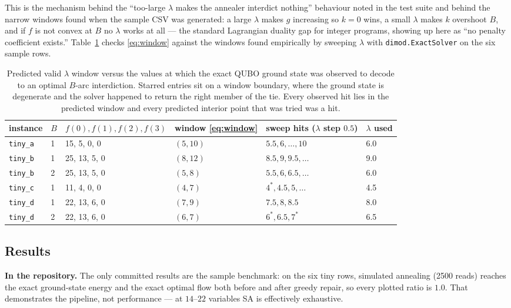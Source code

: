\documentclass[11pt]{article}
\newcommand{\code}[1]{\texttt{#1}}
\begin{document}
This is the mechanism behind the ``too-large $\lambda$ makes the annealer interdict nothing'' behaviour noted in the test suite and behind the narrow windows found when the sample CSV was generated: a large $\lambda$ makes $g$ increasing so $k=0$ wins, a small $\lambda$ makes $k$ overshoot $B$, and if $f$ is not convex at $B$ no $\lambda$ works at all --- the standard Lagrangian duality gap for integer programs, showing up here as ``no penalty coefficient exists.'' Table~\ref{tab:windows} checks \eqref{eq:window} against the windows found empirically by sweeping $\lambda$ with \code{dimod.ExactSolver} on the six sample rows.

\begin{table}[h]
\centering
\small
\begin{tabular}{llllll}
\toprule
instance & $B$ & $f(0),f(1),f(2),f(3)$ & window \eqref{eq:window} & sweep hits ($\lambda$ step $0.5$) & $\lambda$ used \\
\midrule
\code{tiny\_a} & 1 & 15, 5, 0, 0 & $(5, 10)$ & $5.5, 6, \dots, 10$ & 6.0 \\
\code{tiny\_b} & 1 & 25, 13, 5, 0 & $(8, 12)$ & $8.5, 9, 9.5, \dots$ & 9.0 \\
\code{tiny\_b} & 2 & 25, 13, 5, 0 & $(5, 8)$ & $5.5, 6, 6.5, \dots$ & 6.0 \\
\code{tiny\_c} & 1 & 11, 4, 0, 0 & $(4, 7)$ & $4^{*}, 4.5, 5, \dots$ & 4.5 \\
\code{tiny\_d} & 1 & 22, 13, 6, 0 & $(7, 9)$ & $7.5, 8, 8.5$ & 8.0 \\
\code{tiny\_d} & 2 & 22, 13, 6, 0 & $(6, 7)$ & $6^{*}, 6.5, 7^{*}$ & 6.5 \\
\bottomrule
\end{tabular}
\caption{Predicted valid $\lambda$ window versus the values at which the exact QUBO ground state was observed to decode to an optimal $B$-arc interdiction. Starred entries sit on a window boundary, where the ground state is degenerate and the solver happened to return the right member of the tie. Every observed hit lies in the predicted window and every predicted interior point that was tried was a hit.}
\label{tab:windows}
\end{table}

\subsection{Results}
\label{sec:results}

\textbf{In the repository.} The only committed results are the sample benchmark: on the six tiny rows, simulated annealing (2500 reads) reaches the exact ground-state energy and the exact optimal flow both before and after greedy repair, so every plotted ratio is $1.0$. That demonstrates the pipeline, not performance --- at $14$--$22$ variables SA is effectively exhaustive.
\end{document}
